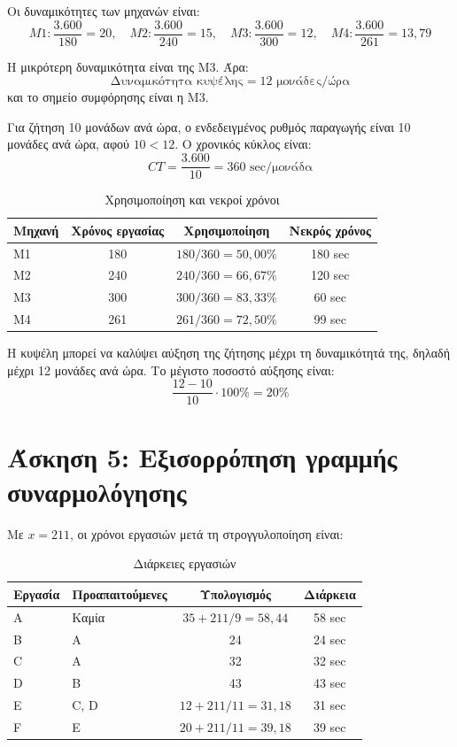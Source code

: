 \documentclass[12pt,a4paper]{article}
\begin{document}
Οι δυναμικότητες των μηχανών είναι:
\[
M1:\frac{3.600}{180}=20,\quad
M2:\frac{3.600}{240}=15,\quad
M3:\frac{3.600}{300}=12,\quad
M4:\frac{3.600}{261}=13{,}79
\]

Η μικρότερη δυναμικότητα είναι της Μ3. Άρα:
\[
\boxed{\text{Δυναμικότητα κυψέλης}=12 \text{ μονάδες/ώρα}}
\]
και το σημείο συμφόρησης είναι η Μ3.

Για ζήτηση 10 μονάδων ανά ώρα, ο ενδεδειγμένος ρυθμός παραγωγής είναι 10 μονάδες ανά ώρα, αφού \(10<12\). Ο χρονικός κύκλος είναι:
\[
CT=\frac{3.600}{10}=360 \text{ sec/μονάδα}
\]

\begin{table}[H]
\centering
\caption{Χρησιμοποίηση και νεκροί χρόνοι}
\begin{tabular}{lccc}
\toprule
\textbf{Μηχανή} & \textbf{Χρόνος εργασίας} & \textbf{Χρησιμοποίηση} & \textbf{Νεκρός χρόνος} \\
\midrule
Μ1 & 180 & \(180/360=50{,}00\%\) & 180 sec \\
Μ2 & 240 & \(240/360=66{,}67\%\) & 120 sec \\
Μ3 & 300 & \(300/360=83{,}33\%\) & 60 sec \\
Μ4 & 261 & \(261/360=72{,}50\%\) & 99 sec \\
\bottomrule
\end{tabular}
\end{table}

Η κυψέλη μπορεί να καλύψει αύξηση της ζήτησης μέχρι τη δυναμικότητά της, δηλαδή μέχρι 12 μονάδες ανά ώρα. Το μέγιστο ποσοστό αύξησης είναι:
\[
\frac{12-10}{10}\cdot100\%=20\%
\]

\section{Άσκηση 5: Εξισορρόπηση γραμμής συναρμολόγησης}

Με \(x=211\), οι χρόνοι εργασιών μετά τη στρογγυλοποίηση είναι:

\begin{table}[H]
\centering
\caption{Διάρκειες εργασιών}
\begin{tabular}{llcc}
\toprule
\textbf{Εργασία} & \textbf{Προαπαιτούμενες} & \textbf{Υπολογισμός} & \textbf{Διάρκεια} \\
\midrule
A & Καμία & \(35+211/9=58{,}44\) & 58 sec \\
B & A & 24 & 24 sec \\
C & A & 32 & 32 sec \\
D & B & 43 & 43 sec \\
E & C, D & \(12+211/11=31{,}18\) & 31 sec \\
F & E & \(20+211/11=39{,}18\) & 39 sec \\
\bottomrule
\end{tabular}
\end{table}
\end{document}
